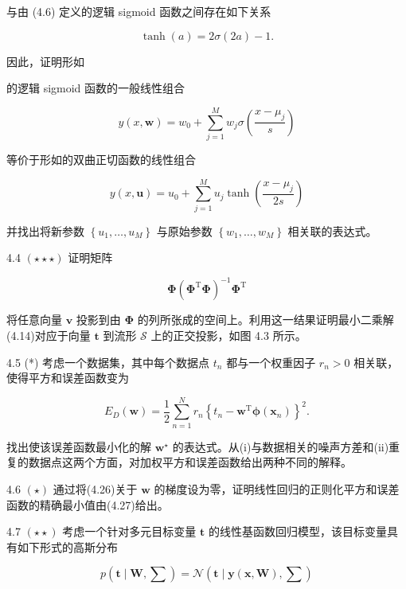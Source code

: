 \documentclass[10pt]{report}
\begin{document}
与由 (4.6) 定义的逻辑 sigmoid 函数之间存在如下关系

\[
\tanh \left( a\right)  = {2\sigma }\left( {2a}\right)  - 1. \tag{4.56}
\]

因此，证明形如

的逻辑 sigmoid 函数的一般线性组合

\[
y\left( {x,\mathbf{w}}\right)  = {w}_{0} + \mathop{\sum }\limits_{{j = 1}}^{M}{w}_{j}\sigma \left( \frac{x - {\mu }_{j}}{s}\right)  \tag{4.57}
\]

等价于形如的双曲正切函数的线性组合

\[
y\left( {x,\mathbf{u}}\right)  = {u}_{0} + \mathop{\sum }\limits_{{j = 1}}^{M}{u}_{j}\tanh \left( \frac{x - {\mu }_{j}}{2s}\right)  \tag{4.58}
\]

并找出将新参数 \(\left\{  {{u}_{1},\ldots ,{u}_{M}}\right\}\) 与原始参数 \(\left\{  {{w}_{1},\ldots ,{w}_{M}}\right\}\) 相关联的表达式。

4.4 \(\left( {\star  \star   \star  }\right)\) 证明矩阵

\[
\mathbf{\Phi }{\left( {\mathbf{\Phi }}^{\mathrm{T}}\mathbf{\Phi }\right) }^{-1}{\mathbf{\Phi }}^{\mathrm{T}} \tag{4.59}
\]

将任意向量 \(\mathbf{v}\) 投影到由 \(\mathbf{\Phi }\) 的列所张成的空间上。利用这一结果证明最小二乘解(4.14)对应于向量 \(\mathbf{t}\) 到流形 \(\mathcal{S}\) 上的正交投影，如图 4.3 所示。

4.5 (*) 考虑一个数据集，其中每个数据点 \({t}_{n}\) 都与一个权重因子 \({r}_{n} > 0\) 相关联，使得平方和误差函数变为

\[
{E}_{D}\left( \mathbf{w}\right)  = \frac{1}{2}\mathop{\sum }\limits_{{n = 1}}^{N}{r}_{n}{\left\{  {t}_{n} - {\mathbf{w}}^{\mathrm{T}}\mathbf{\phi }\left( {\mathbf{x}}_{n}\right) \right\}  }^{2}. \tag{4.60}
\]

找出使该误差函数最小化的解 \({\mathbf{w}}^{ \star  }\) 的表达式。从(i)与数据相关的噪声方差和(ii)重复的数据点这两个方面，对加权平方和误差函数给出两种不同的解释。

4.6 \(\left( \star \right)\) 通过将(4.26)关于 \(\mathbf{w}\) 的梯度设为零，证明线性回归的正则化平方和误差函数的精确最小值由(4.27)给出。

4.7 \(\left( {\star  \star  }\right)\) 考虑一个针对多元目标变量 \(\mathbf{t}\) 的线性基函数回归模型，该目标变量具有如下形式的高斯分布

\[
p\left( {\mathbf{t} \mid  \mathbf{W},\mathbf{\sum }}\right)  = \mathcal{N}\left( {\mathbf{t} \mid  \mathbf{y}\left( {\mathbf{x},\mathbf{W}}\right) ,\mathbf{\sum }}\right)  \tag{4.61}
\]
\end{document}
